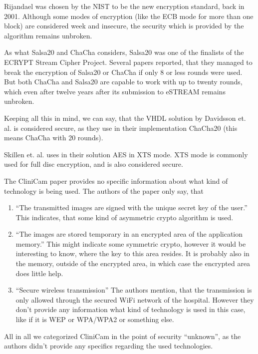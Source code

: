 \documentclass[12pt,a4paper,titlepage,oneside]{scrartcl}
\begin{document}
Rijandael was chosen by the NIST to be the new encryption standard, back in 2001.
Although some modes of encryption (like the ECB mode for more than one block) are considered week and insecure, the security which is provided by the algorithm remains unbroken.

As what Salsa20 and ChaCha considers, Salsa20 was one of the finalists of the ECRYPT Stream Cipher Project. \cite{bernstein2008salsa20}
Several papers reported, that they managed to break the encryption of Salsa20 or ChaCha if only 8 or less rounds were used. \cite{aumasson2008new, crowley2006truncated, fischer2006non, tsunoo2007differential}
But both ChaCha and Salsa20 are capable to work with up to twenty rounds, which even after twelve years after its submission to eSTREAM remains unbroken.

Keeping all this in mind, we can say, that the VHDL solution by Davidsson et. al. is considered secure, as they use in their implementation ChaCha20 (this means ChaCha with 20 rounds). \cite{Davidsson2016}

Skillen et. al. uses in their solution AES in XTS mode.
XTS mode is commonly used for full disc encryption, and is also considered secure. \cite{alomari2014implementation}

The CliniCam paper provides no specific information about what kind of technology is being used.
The authors of the paper only say, that
\begin{enumerate}[label={\alph*}]
  \item ``The transmitted images are signed with the unique secret key of the user.''
    This indicates, that some kind of asymmetric crypto algorithm is used.
  \item ``The images are stored temporary in an encrypted area of the application memory.''
    This might indicate some symmetric crypto, however it would be interesting to know, where the key to this area resides.
    It is probably also in the memory, outside of the encrypted area, in which case the encrypted area does little help.
  \item ``Secure wireless transmission''
    The authors mention, that the transmission is only allowed through the secured WiFi network of the hospital.
    However they don't provide any information what kind of technology is used in this case, like if it is WEP or WPA/WPA2 or something else.
\end{enumerate}
All in all we categorized CliniCam in the point of security ``unknown'', as the authors didn't provide any specifics regarding the used technologies. \cite{pmid25565678}
\end{document}
